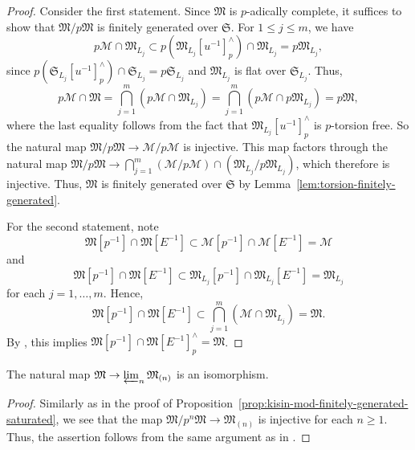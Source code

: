 \begin{proof}
Consider the first statement. Since $\mathfrak{M}$ is $p$-adically complete, it suffices to show that $\mathfrak{M}/p\mathfrak{M}$ is finitely generated over $\mathfrak{S}$. For $1 \leq j \leq m$, we have
\[
p\mathcal{M} \cap \mathfrak{M}_{L_j} \subset p(\mathfrak{M}_{L_j}[u^{-1}]^{\wedge}_p) \cap \mathfrak{M}_{L_j} = p\mathfrak{M}_{L_j},
\]
since $p(\mathfrak{S}_{L_j}[u^{-1}]^{\wedge}_p) \cap \mathfrak{S}_{L_j} = p\mathfrak{S}_{L_j}$ and $\mathfrak{M}_{L_j}$ is flat over $\mathfrak{S}_{L_j}$. Thus,
\[
p\mathcal{M}\cap \mathfrak{M}  = \bigcap_{j=1}^m (p\mathcal{M} \cap \mathfrak{M}_{L_j}) = \bigcap_{j=1}^m (p\mathcal{M} \cap p\mathfrak{M}_{L_j}) = p\mathfrak{M},    
\]
where the last equality follows from the fact that $\mathfrak{M}_{L_j}[u^{-1}]^{\wedge}_p$ is $p$-torsion free. So the natural map $\mathfrak{M}/p\mathfrak{M} \rightarrow \mathcal{M}/p\mathcal{M}$ is injective. This map factors through the natural map $\mathfrak{M}/p\mathfrak{M} \rightarrow \bigcap_{j=1}^m (\mathcal{M}/p \mathcal{M}) \cap (\mathfrak{M}_{L_j}/p\mathfrak{M}_{L_j})$, which therefore is injective. Thus, $\mathfrak{M}$ is finitely generated over $\mathfrak{S}$ by Lemma~\ref{lem:torsion-finitely-generated}.

For the second statement, note 
\[
\mathfrak{M}[p^{-1}] \cap \mathfrak{M}[E^{-1}] \subset \mathcal{M}[p^{-1}] \cap \mathcal{M}[E^{-1}] = \mathcal{M}
\]
and
\[
\mathfrak{M}[p^{-1}] \cap \mathfrak{M}[E^{-1}] \subset \mathfrak{M}_{L_j}[p^{-1}] \cap \mathfrak{M}_{L_j}[E^{-1}] = \mathfrak{M}_{L_j}
\]
for each $j = 1, \ldots, m$. Hence, 
\[
\mathfrak{M}[p^{-1}] \cap \mathfrak{M}[E^{-1}] \subset \bigcap_{j=1}^m (\mathcal{M}\cap \mathfrak{M}_{L_j}) = \mathfrak{M}.
\]
By \cite[Rem.~3.15(i)]{du-liu-moon-shimizu-completed-prismatic-F-crystal-loc-system}, this implies $\mathfrak{M}[p^{-1}] \cap \mathfrak{M}[E^{-1}]^{\wedge}_p = \mathfrak{M}$.
\end{proof}

\begin{lem}
The natural map $\mathfrak{M} \rightarrow \varprojlim_n \mathfrak{M}_{(n)}$ is an isomorphism.
\end{lem}

\begin{proof}
Similarly as in the proof of Proposition~\ref{prop:kisin-mod-finitely-generated-saturated}, we see that the map $\mathfrak{M}/p^n\mathfrak{M} \rightarrow \mathfrak{M}_{(n)}$ is injective for each $n \geq 1$. Thus, the assertion follows from the same argument as in \cite[Lem.~4.22, Pf.]{du-liu-moon-shimizu-completed-prismatic-F-crystal-loc-system}.
\end{proof}

